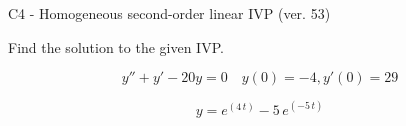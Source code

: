 \begin{exercise}
  \begin{exerciseTitle}C4 - Homogeneous second-order linear IVP (ver. 53)\end{exerciseTitle}
  \begin{exerciseStatement}
    
Find the solution to the given IVP.

    
\[y''+y'-20y = 0 \hspace{1em} y(0) = -4 , y'(0) = 29\]

  \end{exerciseStatement}
  \begin{exerciseAnswer}
    
\[y= e^{\left(4 \, t\right)} - 5 \, e^{\left(-5 \, t\right)}\]

  \end{exerciseAnswer}
\end{exercise}